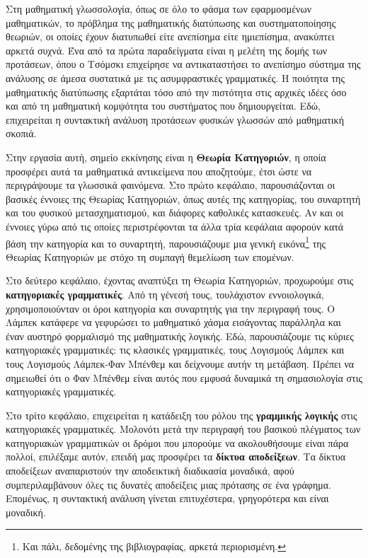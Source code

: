 \documentclass [a4paper,11pt] {book}
\theoremstyle{definition}
\theoremstyle{definition}
\begin{document}
Στη μαθηματική γλωσσολογία, όπως σε όλο το φάσμα των εφαρμοσμένων μαθηματικών, το πρόβλημα της μαθηματικής διατύπωσης και συστηματοποίησης θεωριών, οι οποίες έχουν διατυπωθεί είτε ανεπίσημα είτε ημιεπίσημα, ανακύπτει αρκετά συχνά. Ένα από τα πρώτα παραδείγματα είναι η μελέτη της δομής των προτάσεων, όπου ο Τσόμσκι \citep{citeulike:158531} επιχείρησε να αντικαταστήσει το ανεπίσημο σύστημα της ανάλυσης σε άμεσα συστατικά με τις ασυμφραστικές γραμματικές. Η ποιότητα της μαθηματικής διατύπωσης εξαρτάται τόσο από την πιστότητα στις αρχικές ιδέες όσο και από τη μαθηματική κομψότητα του συστήματος που δημιουργείται. Εδώ, επιχειρείται η συντακτική ανάλυση προτάσεων φυσικών γλωσσών από μαθηματική σκοπιά.

Στην εργασία αυτή, σημείο εκκίνησης είναι η \textbf{Θεωρία Κατηγοριών}, η οποία προσφέρει αυτά τα μαθηματικά αντικείμενα που αποζητούμε, έτσι ώστε να περιγράψουμε τα γλωσσικά φαινόμενα. Στο πρώτο κεφάλαιο, παρουσιάζονται οι βασικές έννοιες της Θεωρίας Κατηγοριών, όπως αυτές της κατηγορίας, του συναρτητή και του φυσικού μετασχηματισμού, και διάφορες καθολικές κατασκευές. Αν και οι έννοιες γύρω από τις οποίες περιστρέφονται τα άλλα τρία κεφάλαια αφορούν κατά βάση την κατηγορία και το συναρτητή, παρουσιάζουμε μια γενική εικόνα\footnote{Και πάλι, δεδομένης της βιβλιογραφίας, αρκετά περιορισμένη.} της Θεωρίας Κατηγοριών με στόχο τη συμπαγή θεμελίωση των επομένων.

Στο δεύτερο κεφάλαιο, έχοντας αναπτύξει τη Θεωρία Κατηγοριών, προχωρούμε στις \textbf{κατηγοριακές γραμματικές}. Από τη γένεσή τους, τουλάχιστον εννοιολογικά, χρησιμοποιούνταν οι όροι κατηγορία και συναρτητής για την περιγραφή τους. Ο Λάμπεκ κατάφερε να γεφυρώσει το μαθηματικό χάσμα εισάγοντας παράλληλα και έναν αυστηρό φορμαλισμό της μαθηματικής λογικής. Εδώ, παρουσιάζουμε τις κύριες κατηγοριακές γραμματικές: τις κλασικές γραμματικές, τους Λογισμούς Λάμπεκ και τους Λογισμούς Λάμπεκ-Φαν Μπένθεμ και δείχνουμε αυτήν τη μετάβαση. Πρέπει να σημειωθεί ότι ο Φαν Μπένθεμ είναι αυτός που εμφυσά δυναμικά τη σημασιολογία στις κατηγοριακές γραμματικές.

Στο τρίτο κεφάλαιο, επιχειρείται η κατάδειξη του ρόλου της \textbf{γραμμικής λογικής} στις κατηγοριακές γραμματικές. Μολονότι μετά την περιγραφή του βασικού πλέγματος των κατηγοριακών γραμματικών οι δρόμοι που μπορούμε να ακολουθήσουμε είναι πάρα πολλοί, επιλέξαμε αυτόν, επειδή μας προσφέρει τα \textbf{δίκτυα αποδείξεων}. Τα δίκτυα αποδείξεων αναπαριστούν την αποδεικτική διαδικασία μοναδικά, αφού συμπεριλαμβάνουν όλες τις δυνατές αποδείξεις μιας πρότασης σε ένα γράφημα. Επομένως, η συντακτική ανάλυση γίνεται επιτυχέστερα, γρηγορότερα και είναι μοναδική.
\end{document}
